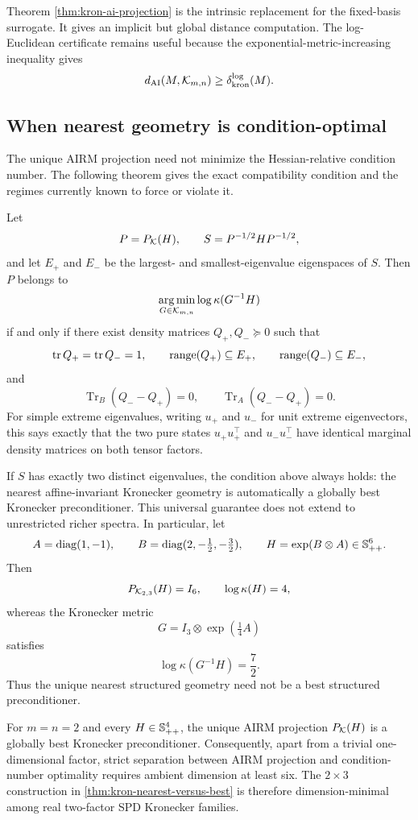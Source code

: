 Theorem \ref{thm:kron-ai-projection} is the intrinsic replacement for the
fixed-basis surrogate. It gives an implicit but global distance computation.
The log-Euclidean certificate remains useful because the
exponential-metric-increasing inequality gives
\[
  d_{\mathrm{AI}}(M,\mathcal K_{m,n})\ge \delta_{\mathrm{kron}}^{\log}(M).
\]

\subsection{When nearest geometry is condition-optimal}

The unique AIRM projection need not minimize the Hessian-relative condition
number.  The following theorem gives the exact compatibility condition and
the regimes currently known to force or violate it.

\begin{theorem}
\label{thm:kron-nearest-versus-best}
Let
\[
  P=P_{\mathcal K}(H),
  \qquad S=P^{-1/2}HP^{-1/2},
\]
and let \(E_+\) and \(E_-\) be the largest- and smallest-eigenvalue
eigenspaces of \(S\). Then \(P\) belongs to
\[
  \operatorname*{arg\,min}_{G\in\mathcal K_{m,n}}\log\kappa(G^{-1}H)
\]
if and only if there exist density matrices \(Q_+,Q_-\succeq0\) such that
\[
  \operatorname{tr} Q_+=\operatorname{tr} Q_-=1,
  \qquad
  \operatorname{range}(Q_+)\subseteq E_+,
  \qquad
  \operatorname{range}(Q_-)\subseteq E_-,
\]
and
\[
  \operatorname{Tr}_B(Q_--Q_+)=0,
  \qquad
  \operatorname{Tr}_A(Q_--Q_+)=0.
\]
For simple extreme eigenvalues, writing \(u_+\) and \(u_-\) for unit extreme
eigenvectors, this says exactly that the two pure states
\(u_+u_+^\top\) and \(u_-u_-^\top\) have identical marginal density matrices
on both tensor factors.

If \(S\) has exactly two distinct eigenvalues, the condition above always
holds: the nearest affine-invariant Kronecker geometry is automatically a
globally best Kronecker preconditioner.  This universal guarantee does not
extend to unrestricted richer spectra.  In particular, let
\[
  A=\operatorname{diag}(1,-1),
  \qquad
  B=\operatorname{diag}(2,-\tfrac12,-\tfrac32),
  \qquad
  H=\exp(B\otimes A)\in\mathbb S_{++}^6.
\]
Then
\[
  P_{\mathcal K_{2,3}}(H)=I_6,
  \qquad
  \log\kappa(H)=4,
\]
whereas the Kronecker metric
\[
  G=I_3\otimes\exp(\tfrac14A)
\]
satisfies
\[
  \log\kappa(G^{-1}H)=\frac72.
\]
Thus the unique nearest structured geometry need not be a best structured
preconditioner.
\end{theorem}

\begin{corollary}
\label{cor:kron-two-by-two-completeness}
For \(m=n=2\) and every \(H\in\mathbb S_{++}^4\), the unique AIRM projection
\(P_{\mathcal K}(H)\) is a globally best Kronecker preconditioner.  Consequently,
apart from a trivial one-dimensional factor, strict separation between AIRM
projection and condition-number optimality requires ambient dimension at least
six.  The \(2\times3\) construction in
\cref{thm:kron-nearest-versus-best} is therefore dimension-minimal among real
two-factor SPD Kronecker families.
\end{corollary}


